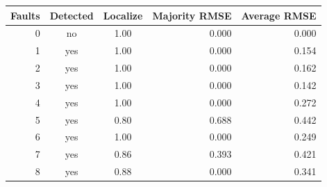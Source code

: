 \begin{tabular}{rccrr}
\toprule
Faults & Detected & Localize & Majority RMSE & Average RMSE \\
\midrule
0 & no & 1.00 & 0.000 & 0.000 \\
1 & yes & 1.00 & 0.000 & 0.154 \\
2 & yes & 1.00 & 0.000 & 0.162 \\
3 & yes & 1.00 & 0.000 & 0.142 \\
4 & yes & 1.00 & 0.000 & 0.272 \\
5 & yes & 0.80 & 0.688 & 0.442 \\
6 & yes & 1.00 & 0.000 & 0.249 \\
7 & yes & 0.86 & 0.393 & 0.421 \\
8 & yes & 0.88 & 0.000 & 0.341 \\
\bottomrule
\end{tabular}
